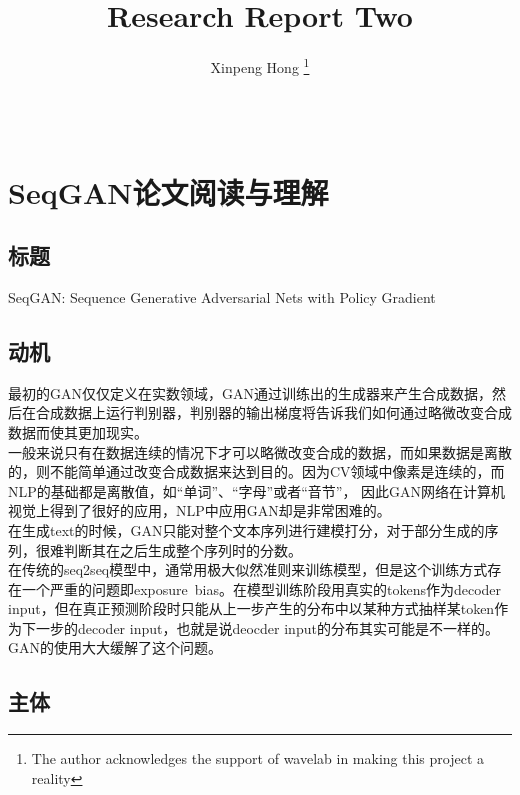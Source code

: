 \documentclass[11pt,a4paper]{ctexart}
\title{Research Report Two}
\author{Xinpeng Hong
	\thanks{The author acknowledges the support of wavelab in
		making this project a reality}\\
	\\\\
}
\begin{document}
\makecover
\maketitle
	

\section{SeqGAN论文阅读与理解}
\subsection{标题}
\noindent SeqGAN: Sequence Generative Adversarial Nets with Policy Gradient
\subsection{动机}
\noindent 最初的GAN仅仅定义在实数领域，GAN通过训练出的生成器来产生合成数据，然后在合成数据上运行判别器，判别器的输出梯度将告诉我们如何通过略微改变合成数据而使其更加现实。\\
一般来说只有在数据连续的情况下才可以略微改变合成的数据，而如果数据是离散的，则不能简单通过改变合成数据来达到目的。因为CV领域中像素是连续的，而NLP的基础都是离散值，如“单词”、“字母”或者“音节”， 因此GAN网络在计算机视觉上得到了很好的应用，NLP中应用GAN却是非常困难的。\\
在生成text的时候，GAN只能对整个文本序列进行建模打分，对于部分生成的序列，很难判断其在之后生成整个序列时的分数。\\
在传统的seq2seq模型中，通常用极大似然准则来训练模型，但是这个训练方式存在一个严重的问题即exposure bias。在模型训练阶段用真实的tokens作为decoder input，但在真正预测阶段时只能从上一步产生的分布中以某种方式抽样某token作为下一步的decoder input，也就是说deocder input的分布其实可能是不一样的。GAN的使用大大缓解了这个问题。
\subsection{主体}
\end{document}
